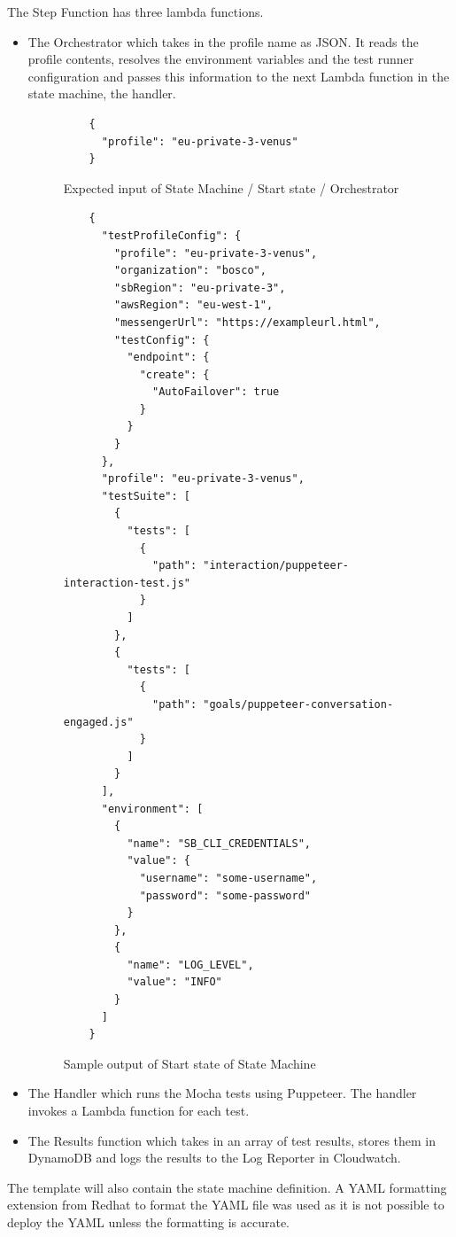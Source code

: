 \documentclass[12pt,a4paper,titlepage]{report}
\begin{document}
The Step Function has three lambda functions. 
\begin{itemize}
  \item The Orchestrator which takes in the profile name as JSON. It reads the profile contents, resolves the environment variables and the test runner configuration and passes this information to the next Lambda function in the state machine, the handler.  

\begin{figure}[H]
  \begin{tcolorbox}
   \begin{verbatim}
    {
      "profile": "eu-private-3-venus"
    }
   \end{verbatim}
  \end{tcolorbox}
  \caption{Expected input of State Machine / Start state / Orchestrator}
 \end{figure}

 \begin{figure}[H]
  \begin{tcolorbox}
   \begin{verbatim}
    {
      "testProfileConfig": {
        "profile": "eu-private-3-venus",
        "organization": "bosco",
        "sbRegion": "eu-private-3",
        "awsRegion": "eu-west-1",
        "messengerUrl": "https://exampleurl.html",
        "testConfig": {
          "endpoint": {
            "create": {
              "AutoFailover": true
            }
          }
        }
      },
      "profile": "eu-private-3-venus",
      "testSuite": [
        {
          "tests": [
            {
              "path": "interaction/puppeteer-interaction-test.js"
            }
          ]
        },
        {
          "tests": [
            {
              "path": "goals/puppeteer-conversation-engaged.js"
            }
          ]
        }
      ],
      "environment": [
        {
          "name": "SB_CLI_CREDENTIALS",
          "value": {
            "username": "some-username",
            "password": "some-password"
          }
        },
        {
          "name": "LOG_LEVEL",
          "value": "INFO"
        }
      ]
    }
 \end{verbatim}
  \end{tcolorbox}
  \caption{Sample output of Start state of State Machine}
 \end{figure}

 \item The Handler which runs the Mocha tests using Puppeteer. The handler invokes a Lambda function for each test.
 \item The Results function which takes in an array of test results, stores them in DynamoDB and logs the results to the Log Reporter in Cloudwatch.
\end{itemize}
 The
template will also contain the state machine definition. A YAML formatting extension from Redhat to format the YAML
file was used as it is not possible to deploy the YAML unless the formatting is accurate.
\end{document}
